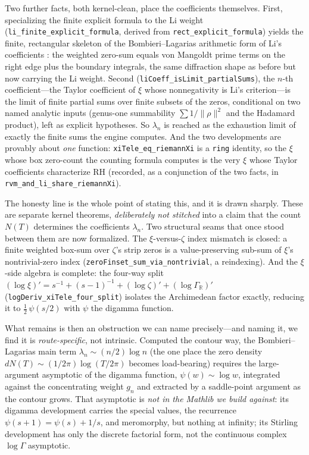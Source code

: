 Two further facts, both kernel-clean, place the coefficients themselves. First,
specializing the finite explicit formula to the Li weight
(\texttt{li\_finite\_explicit\_formula}, derived from
\texttt{rect\_explicit\_formula}) yields the finite, rectangular skeleton of the
Bombieri--Lagarias arithmetic form of Li's coefficients
\cite{bombierilagarias1999}: the weighted zero-sum equals von Mangoldt prime
terms on the right edge plus the boundary integrals, the same diffraction shape
as before but now carrying the Li weight. Second
(\texttt{liCoeff\_isLimit\_partialSums}), the $n$-th coefficient---the Taylor
coefficient of $\xi$ whose nonnegativity is Li's criterion---is the limit of
finite partial sums over finite subsets of the zeros, conditional on two named
analytic inputs (genus-one summability $\sum 1/\lVert\rho\rVert^2$ and the
Hadamard product), left as explicit hypotheses. So $\lambda_n$ is reached as the
exhaustion limit of exactly the finite sums the engine computes. And the two
developments are provably about \emph{one} function: \texttt{xiTele\_eq\_riemannXi}
is a \texttt{ring} identity, so the $\xi$ whose box zero-count the counting
formula computes is the very $\xi$ whose Taylor coefficients characterize RH
(recorded, as a conjunction of the two facts, in
\texttt{rvm\_and\_li\_share\_riemannXi}).

The honesty line is the whole point of stating this, and it is drawn sharply.
These are separate kernel theorems, \emph{deliberately not stitched} into a
claim that the count $N(T)$ determines the coefficients $\lambda_n$. Two
structural seams that once stood between them are now formalized. The
$\xi$-versus-$\zeta$ index mismatch is closed: a finite weighted box-sum over
$\zeta$'s strip zeros is a value-preserving sub-sum of $\xi$'s nontrivial-zero
index (\texttt{zeroFinset\_sum\_via\_nontrivial}, a reindexing). And the
$\xi$-side algebra is complete: the four-way split
$(\log\xi)' = s^{-1} + (s-1)^{-1} + (\log\zeta)' + (\log\Gamma_{\mathbb R})'$
(\texttt{logDeriv\_xiTele\_four\_split}) isolates the Archimedean factor exactly,
reducing it to $\tfrac12\,\psi(s/2)$ with $\psi$ the digamma function.

What remains is then an obstruction we can name precisely---and naming it, we
find it is \emph{route-specific}, not intrinsic. Computed the contour way, the
Bombieri--Lagarias main term $\lambda_n \sim (n/2)\log n$ (the one place the zero
density $dN(T) \sim (1/2\pi)\log(T/2\pi)$ becomes load-bearing) requires the
large-argument asymptotic of the digamma function, $\psi(w) \sim \log w$,
integrated against the concentrating weight $g_n$ and extracted by a saddle-point
argument as the contour grows. That asymptotic is \emph{not in the Mathlib we
build against}: its digamma development carries the special values, the recurrence
$\psi(s{+}1) = \psi(s) + 1/s$, and meromorphy, but nothing at infinity; its
Stirling development has only the discrete factorial form, not the continuous
complex $\log\Gamma$ asymptotic.


